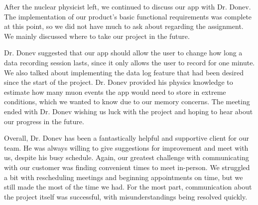 \documentclass[11pt,a4paper]{article}
\begin{document}
After the nuclear physicist left, we continued to discuss our app with Dr. Donev. The implementation of our product’s basic functional requirements was complete at this point, so we did not have much to ask about regarding the assignment. We mainly discussed where to take our project in the future. 

Dr. Donev suggested that our app should allow the user to change how long a data recording session lasts, since it only allows the user to record for one minute. We also talked about implementing the data log feature that had been desired since the start of the project. Dr. Donev provided his physics knowledge to estimate how many muon events the app would need to store in extreme conditions, which we wanted to know due to our memory concerns. The meeting ended with Dr. Donev wishing us luck with the project and hoping to hear about our progress in the future.

Overall, Dr. Donev has been a fantastically helpful and supportive client for our team. He was always willing to give suggestions for improvement and meet with us, despite his busy schedule. Again, our greatest challenge with communicating with our customer was finding convenient times to meet in-person. We struggled a bit with rescheduling meetings and beginning appointments on time, but we still made the most of the time we had. For the most part, communication about the project itself was successful, with misunderstandings being resolved quickly.
\end{document}
